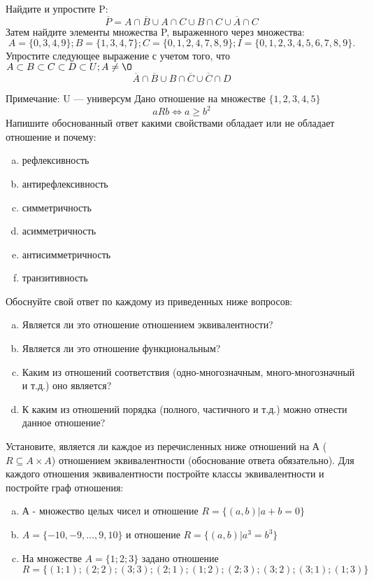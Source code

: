 \documentclass[10pt]{exam}
\begin{document}
\begin{questions}
\question
Найдите и упростите P:
\begin{equation*}
\overline{P} = A \cap \overline{B} \cup A \cap C \cup B \cap C \cup \overline{A} \cap C
\end{equation*}
Затем найдите элементы множества P, выраженного через множества:
\begin{equation*}
A = \{0, 3, 4, 9\}; 
B = \{1, 3, 4, 7\};
C = \{0, 1, 2, 4, 7, 8, 9\};
I = \{0, 1, 2, 3, 4, 5, 6, 7, 8, 9\}.
\end{equation*}\question
Упростите следующее выражение с учетом того, что $A\subset B \subset C \subset D \subset U; A \neq \O$
\begin{equation*}
\overline{A} \cap \overline{B} \cup B \cap \overline{C} \cup \overline{C} \cap D
\end{equation*}

Примечание: U — универсум\question
Дано отношение на множестве $\{1, 2, 3, 4, 5\}$ 
\begin{equation*}
aRb \iff a \geq b^2
\end{equation*}
Напишите обоснованный ответ какими свойствами обладает или не обладает отношение и почему:   
\begin{enumerate} [a)]\setcounter{enumi}{0}
\item рефлексивность
\item антирефлексивность
\item симметричность
\item асимметричность
\item антисимметричность
\item транзитивность
\end{enumerate}

Обоснуйте свой ответ по каждому из приведенных ниже вопросов:
\begin{enumerate} [a)]\setcounter{enumi}{0}
    \item Является ли это отношение отношением эквивалентности?
    \item Является ли это отношение функциональным?
    \item Каким из отношений соответствия (одно-многозначным, много-многозначный и т.д.) оно является?
    \item К каким из отношений порядка (полного, частичного и т.д.) можно отнести данное отношение?
\end{enumerate}


\question
Установите, является ли каждое из перечисленных ниже отношений на А ($R \subseteq A \times A$) отношением эквивалентности (обоснование ответа обязательно). Для каждого отношения эквивалентности 
постройте классы эквивалентности и постройте граф отношения:
\begin{enumerate}[a)]\setcounter{enumi}{0}
\item А - множество целых чисел и отношение $R = \{(a,b)|a + b = 0\}$
\item $A = \{-10, -9, …, 9, 10\}$ и отношение $R = \{(a,b)|a^{3} = b^{3}\}$
\item На множестве $A = \{1; 2; 3\}$ задано отношение $R = \{(1; 1); (2; 2); (3; 3); (2; 1); (1; 2); (2; 3); (3; 2); (3; 1); (1; 3)\}$


\end{enumerate}
\end{questions}
\end{document}
